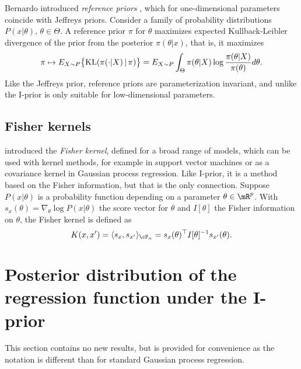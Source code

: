 \documentclass[preprint,12pt,authoryear]{elsarticle}
\begin{document}
Bernardo introduced {\em reference priors} \citep{bernardo79,bernardo05,bbs09}, which for one-dimensional parameters coincide with Jeffreys priors. Consider a family of probability distributions $P(x|\theta)$, $\theta\in\Theta$. A reference prior $\pi$ for $\theta$ maximizes expected Kullback-Leibler divergence of the prior from the posterior $\pi(\theta|x)$, that is, it maximizes
\[  \pi \mapsto E_{X\sim P}\big\{\text{\rm KL}(\pi(\cdot|X)\,|\,\pi)\big\} = E_{X\sim P}\int_\Theta\pi(\theta|X)\log\frac{\pi(\theta|X)}{\pi(\theta)}d\theta .  \]
Like the Jeffreys prior, reference priors are parameterization invariant, and unlike the I-prior is only suitable for low-dimensional parameters. 



\subsection{Fisher kernels}	

\citet{jh98} introduced the {\em Fisher kernel}, defined for a broad range of models, which can be used with kernel methods, for example in support vector machines or as a covariance kernel in Gaussian process regression. Like I-prior, it is a method based on the Fisher information, but that is the only connection.
Suppose $P(x|\theta)$ is a probability function depending on a parameter $\theta\in\mR^p$. With $s_x(\theta)=\nabla_\theta\log P(x|\theta)$ the score vector for $\theta$ and $I[\theta]$ the Fisher information on $\theta$, the Fisher kernel is defined as
\[  K(x,x') = \langle s_x,s_{x'}\rangle_{\cF_n} = s_{x}(\theta)^\top I[\theta]^{-1}s_{x'}(\theta). \]




\section{Posterior distribution of the regression function under the \mbox{I-prior}}\label{sec-marg}

This section contains no new results, but is provided for convenience as the notation is different than for standard Gaussian process regression.  

\end{document}
